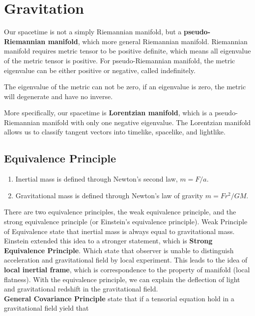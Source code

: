 \documentclass[12pt]{article}
\theoremstyle{mystyle}{\newtheorem{definition}{Definition}[section]}
\theoremstyle{mystyle}{\newtheorem{theorem}[definition]{Theorem}}
\theoremstyle{mystyle}{\newtheorem*{remark}{Remark}}
\theoremstyle{mystyle}{\newtheorem*{example}{Example}}
\theoremstyle{mystyle}{\newtheorem*{examples}{Examples}}
\theoremstyle{cstyle}{\newtheorem*{cthm}{}}
\begin{document}
\section{Gravitation}

Our spacetime is not a simply Riemannian manifold, but a \textbf{pseudo-Riemannian manifold}, which more general Riemannian manifold.
Riemannian manifold requires metric tensor to be positive definite, which means all eigenvalue of the metric tensor is positive.
For pseudo-Riemannian manifold, the metric eigenvalue can be either positive or negative, called indefinitely.

\begin{remark}
  The eigenvalue of the metric can not be zero, if an eigenvalue is zero, the metric will degenerate and have no inverse.
\end{remark}

More specifically, our spacetime is \textbf{Lorentzian manifold}, which is a pseudo-Riemannian manifold with only one negative eigenvalue.
The Lorentzian manifold allows us to classify tangent vectors into timelike, spacelike, and lightlike.

\subsection{Equivalence Principle}
\begin{definition}
  \textbf{  }
  \begin{enumerate}
    \item Inertial mass is defined through Newton's second law, \(m = F/a\).
    \item Gravitational mass is defined through Newton's law of gravity \(m = Fr^2/GM\).
  \end{enumerate}
\end{definition}

There are two equivalence principles, the weak equivalence principle, and the strong equivalence principle
(or Einstein's equivalence principle). Weak Principle of Equivalence state that inertial mass is always equal to gravitational mass.
Einstein extended this idea to a stronger statement, which is \textbf{Strong Equivalence Principle}.
Which state that observer is unable to distinguish acceleration and gravitational field by local experiment.
This leads to the idea of \textbf{local inertial frame}, which is correspondence to the property of manifold (local flatness).
With the equivalence principle, we can explain the deflection of light and gravitational redshift in the gravitational field.\\
\textbf{General Covariance Principle} state that if a tensorial equation hold in a gravitational field yield that
\end{document}
